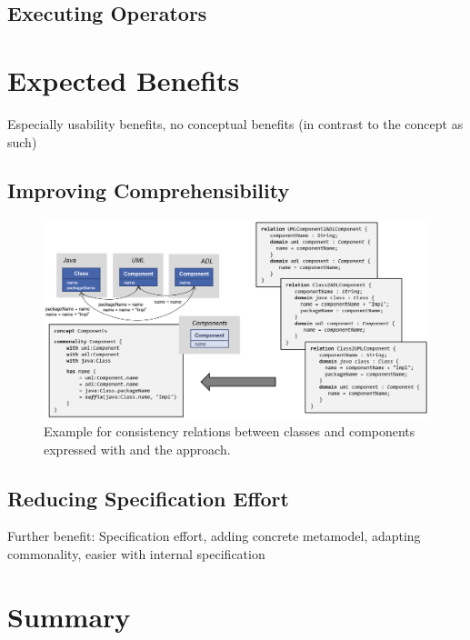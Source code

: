 \subsection{Executing Operators}


\section{Expected Benefits}

Especially usability benefits, no conceptual benefits (in contrast to the concept as such)

\subsection{Improving Comprehensibility}

\begin{figure}
    \centering
    \includegraphics[width=\textwidth]{figures/quality/language/benefit_comprehensibility.png}
    \caption[Benefit of \commonalities regarding comprehensibility]{Example for consistency relations between classes and components expressed with \qvtr and the \commonalities approach.}
    \label{fig:language:benefit_comprehensibility}
\end{figure}

\subsection{Reducing Specification Effort}

Further benefit: Specification effort, adding concrete metamodel, adapting commonality, easier with internal specification


\section{Summary}

